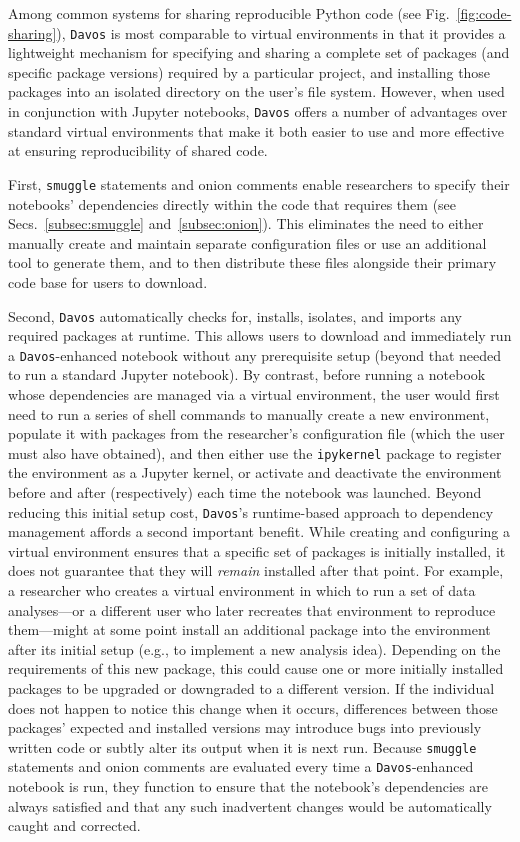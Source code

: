 \documentclass[preprint,12pt,a4paper]{elsarticle}
\begin{document}
Among common systems for sharing reproducible Python code (see Fig.~\ref{fig:code-sharing}), \texttt{Davos} is most comparable to virtual environments in that it provides a lightweight mechanism for specifying and sharing a complete set of packages (and specific package versions) required by a particular project, and installing those packages into an isolated directory on the user's file system.
However, when used in conjunction with Jupyter notebooks, \texttt{Davos} offers a number of advantages over standard virtual environments that make it both easier to use and more effective at ensuring reproducibility of shared code.

First, \texttt{smuggle} statements and onion comments enable researchers to specify their notebooks' dependencies directly within the code that requires them (see Secs.~\ref{subsec:smuggle} and~\ref{subsec:onion}).
This eliminates the need to either manually create and maintain separate configuration files or use an additional tool to generate them, and to then distribute these files alongside their primary code base for users to download.

Second, \texttt{Davos} automatically checks for, installs, isolates, and imports any required packages at runtime.
This allows users to download and immediately run a \texttt{Davos}-enhanced notebook without any prerequisite setup (beyond that needed to run a standard Jupyter notebook).
By contrast, before running a notebook whose dependencies are managed via a virtual environment, the user would first need to run a series of shell commands to manually create a new environment, populate it with packages from the researcher's configuration file (which the user must also have obtained), and then either use the \texttt{ipykernel} package to register the environment as a Jupyter kernel, or activate and deactivate the environment before and after (respectively) each time the notebook was launched.
Beyond reducing this initial setup cost, \texttt{Davos}'s runtime-based approach to dependency management affords a second important benefit.
While creating and configuring a virtual environment ensures that a specific set of packages is initially installed, it does not guarantee that they will \textit{remain} installed after that point.
For example, a researcher who creates a virtual environment in which to run a set of data analyses---or a different user who later recreates that environment to reproduce them---might at some point install an additional package into the environment after its initial setup (e.g., to implement a new analysis idea).
Depending on the requirements of this new package, this could cause one or more initially installed packages to be upgraded or downgraded to a different version.
If the individual does not happen to notice this change when it occurs, differences between those packages' expected and installed versions may introduce bugs into previously written code or subtly alter its output when it is next run.
Because \texttt{smuggle} statements and onion comments are evaluated every time a \texttt{Davos}-enhanced notebook is run, they function to ensure that the notebook's dependencies are always satisfied and that any such inadvertent changes would be automatically caught and corrected.
\end{document}
